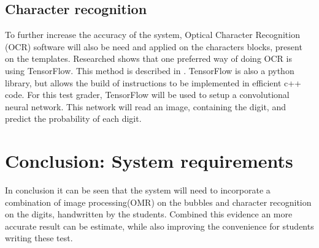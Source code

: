 \subsection{Character recognition}
To further increase the accuracy of the system, Optical Character Recognition (OCR) software will also be need and applied on the characters blocks, present on the templates. Researched shows that one preferred way of doing OCR is using TensorFlow. This method is described in \citet{Tensor}. TensorFlow is also a python library, but allows the build of instructions to be implemented in ef{f}icient c++ code. For this test grader, TensorFlow will be used to setup a convolutional neural network. This network will read an image, containing the digit, and predict the probability of each digit.

\section{Conclusion: System requirements}

In conclusion it can be seen that the system will need to incorporate a combination of image processing(OMR) on the bubbles and character recognition on the digits, handwritten by the students. Combined this evidence an more accurate result can be estimate, while also improving the convenience for students writing these test.

